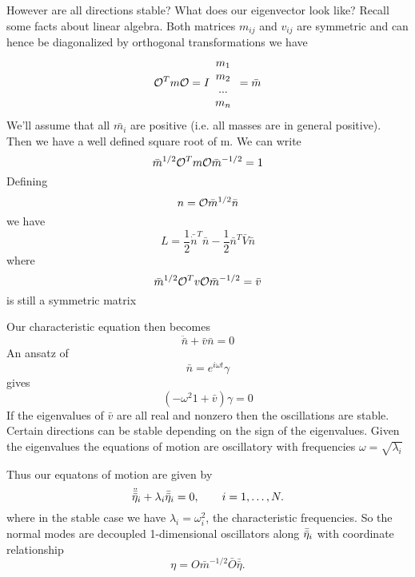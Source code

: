 However are all directions stable? What does our eigenvector look like? Recall some facts about linear algebra. Both matrices $m_{ij}$ and $v_{ij}$ are symmetric and can hence be diagonalized by orthogonal transformations we have 
\begin{equation}
\mathcal{O}^T m \mathcal{O} = I \begin{array}{c} m_1 \\ m_2 \\ ... \\ m_n\end{array} = \bar{m}
\end{equation}
We'll assume that all $\bar{m_i}$ are positive (i.e. all masses are in general positive). Then we have a well defined square root of m. We can write
\begin{equation}
\bar{m}^{1/2} \mathcal{O}^T m \mathcal{O} \bar{m}^{-1/2} = 1
\end{equation}
Defining 
\begin{equation}
n = \mathcal{O} \bar{m}^{1/2} \bar{n}
\end{equation}
we have 
\begin{equation}
L = \frac{1}{2} \bar{\dot{n}}^T \bar{n} - \frac{1}{2} \bar{n}^T \bar{V} \bar{n}
\end{equation}
where 
\begin{equation}
\bar{m}^{1/2} \mathcal{O}^T v \mathcal{O} \bar{m}^{-1/2} = \bar{v}
\end{equation}
is still a symmetric matrix

Our characteristic equation then becomes
\begin{equation}
\ddot{\bar{n}} + \bar{v} \bar{n} = 0
\end{equation}
An ansatz of 
\begin{equation}
\bar{n} = e^{i\omega t} \gamma
\end{equation}
gives 
\begin{equation}
(-\omega^2 1 + \bar{v})\gamma = 0
\end{equation}
If the eigenvalues of $\bar{v}$ are all real and nonzero then the oscillations are stable. Certain directions can be stable depending on the sign of the eigenvalues. Given the eigenvalues the equations of motion are oscillatory with frequencies $\omega =  \sqrt{\lambda_i}$


Thus our equatons of motion are given by
\begin{equation}
\ddot{\bar{\bar{\eta}}}_i + \lambda_i \bar{\bar{\eta}}_i = 0, \qquad i = 1, \dots, N.
\end{equation}
where in the stable case we have $\lambda_i = \omega_i^2$, the characteristic frequencies. So the normal modes are decoupled 1-dimensional oscillators along $\bar{\bar{\eta}}_i$ with coordinate relationship
\begin{equation}
\eta = O \bar{m}^{-1/2} \bar{O} \bar{\bar{\eta}}. 
\end{equation}

